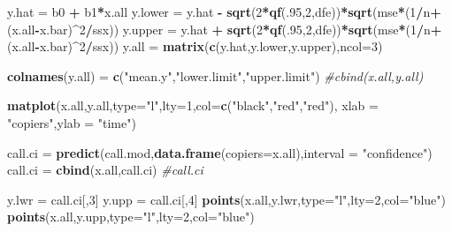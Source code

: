 \documentclass[
]{article}
\newenvironment{Shaded}{\begin{snugshade}}{\end{snugshade}}
\newcommand{\AttributeTok}[1]{\textcolor[rgb]{0.13,0.29,0.53}{#1}}
\newcommand{\CommentTok}[1]{\textcolor[rgb]{0.56,0.35,0.01}{\textit{#1}}}
\newcommand{\DecValTok}[1]{\textcolor[rgb]{0.00,0.00,0.81}{#1}}
\newcommand{\FunctionTok}[1]{\textcolor[rgb]{0.13,0.29,0.53}{\textbf{#1}}}
\newcommand{\NormalTok}[1]{#1}
\newcommand{\OtherTok}[1]{\textcolor[rgb]{0.56,0.35,0.01}{#1}}
\newcommand{\SpecialCharTok}[1]{\textcolor[rgb]{0.81,0.36,0.00}{\textbf{#1}}}
\newcommand{\StringTok}[1]{\textcolor[rgb]{0.31,0.60,0.02}{#1}}
\begin{document}
\begin{Shaded}
\begin{Highlighting}[]
\NormalTok{y.hat }\OtherTok{=}\NormalTok{ b0 }\SpecialCharTok{+}\NormalTok{ b1}\SpecialCharTok{*}\NormalTok{x.all}
\NormalTok{y.lower }\OtherTok{=}\NormalTok{ y.hat }\SpecialCharTok{{-}} \FunctionTok{sqrt}\NormalTok{(}\DecValTok{2}\SpecialCharTok{*}\FunctionTok{qf}\NormalTok{(.}\DecValTok{95}\NormalTok{,}\DecValTok{2}\NormalTok{,dfe))}\SpecialCharTok{*}\FunctionTok{sqrt}\NormalTok{(mse}\SpecialCharTok{*}\NormalTok{(}\DecValTok{1}\SpecialCharTok{/}\NormalTok{n}\SpecialCharTok{+}\NormalTok{(x.all}\SpecialCharTok{{-}}\NormalTok{x.bar)}\SpecialCharTok{\^{}}\DecValTok{2}\SpecialCharTok{/}\NormalTok{ssx))}
\NormalTok{y.upper }\OtherTok{=}\NormalTok{ y.hat }\SpecialCharTok{+} \FunctionTok{sqrt}\NormalTok{(}\DecValTok{2}\SpecialCharTok{*}\FunctionTok{qf}\NormalTok{(.}\DecValTok{95}\NormalTok{,}\DecValTok{2}\NormalTok{,dfe))}\SpecialCharTok{*}\FunctionTok{sqrt}\NormalTok{(mse}\SpecialCharTok{*}\NormalTok{(}\DecValTok{1}\SpecialCharTok{/}\NormalTok{n}\SpecialCharTok{+}\NormalTok{(x.all}\SpecialCharTok{{-}}\NormalTok{x.bar)}\SpecialCharTok{\^{}}\DecValTok{2}\SpecialCharTok{/}\NormalTok{ssx))}
\NormalTok{y.all }\OtherTok{=} \FunctionTok{matrix}\NormalTok{(}\FunctionTok{c}\NormalTok{(y.hat,y.lower,y.upper),}\AttributeTok{ncol=}\DecValTok{3}\NormalTok{)}

\FunctionTok{colnames}\NormalTok{(y.all) }\OtherTok{=} \FunctionTok{c}\NormalTok{(}\StringTok{"mean.y"}\NormalTok{,}\StringTok{"lower.limit"}\NormalTok{,}\StringTok{"upper.limit"}\NormalTok{)}
\CommentTok{\#cbind(x.all,y.all)}

\FunctionTok{matplot}\NormalTok{(x.all,y.all,}\AttributeTok{type=}\StringTok{"l"}\NormalTok{,}\AttributeTok{lty=}\DecValTok{1}\NormalTok{,}\AttributeTok{col=}\FunctionTok{c}\NormalTok{(}\StringTok{"black"}\NormalTok{,}\StringTok{"red"}\NormalTok{,}\StringTok{"red"}\NormalTok{),}
        \AttributeTok{xlab =} \StringTok{"copiers"}\NormalTok{,}\AttributeTok{ylab =} \StringTok{"time"}\NormalTok{)}

\NormalTok{call.ci }\OtherTok{=} \FunctionTok{predict}\NormalTok{(call.mod,}\FunctionTok{data.frame}\NormalTok{(}\AttributeTok{copiers=}\NormalTok{x.all),}\AttributeTok{interval =} \StringTok{"confidence"}\NormalTok{)}
\NormalTok{call.ci }\OtherTok{=} \FunctionTok{cbind}\NormalTok{(x.all,call.ci)}
\CommentTok{\#call.ci}

\NormalTok{y.lwr }\OtherTok{=}\NormalTok{ call.ci[,}\DecValTok{3}\NormalTok{]}
\NormalTok{y.upp }\OtherTok{=}\NormalTok{ call.ci[,}\DecValTok{4}\NormalTok{]}
\FunctionTok{points}\NormalTok{(x.all,y.lwr,}\AttributeTok{type=}\StringTok{"l"}\NormalTok{,}\AttributeTok{lty=}\DecValTok{2}\NormalTok{,}\AttributeTok{col=}\StringTok{"blue"}\NormalTok{)}
\FunctionTok{points}\NormalTok{(x.all,y.upp,}\AttributeTok{type=}\StringTok{"l"}\NormalTok{,}\AttributeTok{lty=}\DecValTok{2}\NormalTok{,}\AttributeTok{col=}\StringTok{"blue"}\NormalTok{)}
\end{Highlighting}
\end{Shaded}
\end{document}
